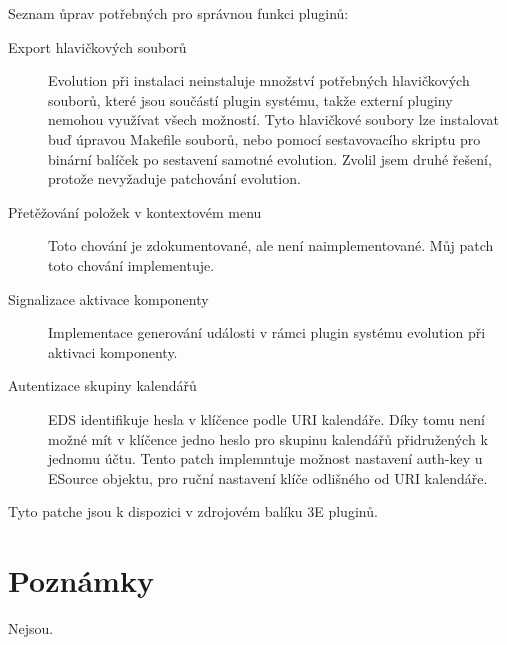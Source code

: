\documentclass[a4paper,10pt]{article}
\begin{document}
\begin{multicols*}{2}
Seznam ůprav potřebných pro správnou funkci pluginů:
\begin{description}
\item[Export hlavičkových souborů] Evolution při instalaci neinstaluje množství
potřebných hlavičkových souborů, které jsou součástí plugin systému, takže
externí pluginy nemohou využívat všech možností. Tyto hlavičkové soubory lze
instalovat buď úpravou Makefile souborů, nebo pomocí sestavovacího skriptu pro
binární balíček po sestavení samotné evolution. Zvolil jsem druhé řešení,
protože nevyžaduje patchování evolution.
\item[Přetěžování položek v kontextovém menu] Toto chování je zdokumentované,
ale není naimplementované. Můj patch toto chování implementuje.
\item[Signalizace aktivace komponenty] Implementace generování události
v rámci plugin systému evolution při aktivaci komponenty.
\item[Autentizace skupiny kalendářů] EDS identifikuje hesla v klíčence podle URI
kalendáře. Díky tomu není možné mít v klíčence jedno heslo pro skupinu kalendářů
přidružených k jednomu účtu. Tento patch implemntuje možnost nastavení auth-key
u ESource objektu, pro ruční nastavení klíče odlišného od URI kalendáře.
\end{description}

Tyto patche jsou k dispozici v zdrojovém balíku 3E pluginů.

\section{Poznámky}

Nejsou.

\end{multicols*}
\end{document}
